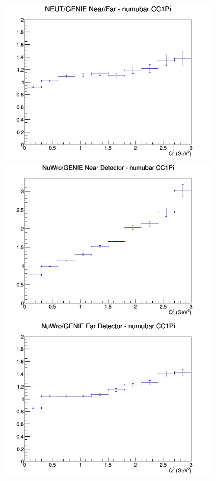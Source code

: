 \begin{figure}[h]
\endminipage
{}
\includegraphics[width=\linewidth]{eff_Q2/GAr/ratios/CC1Pi_NEUT_GENIE_numubar_NF_Q2.png}
\endminipage
\newline
{}
\includegraphics[width=\linewidth]{eff_Q2/GAr/ratios/CC1Pi_NuWro_GENIE_numubar_near_Q2.png}
\endminipage
{}
\includegraphics[width=\linewidth]{eff_Q2/GAr/ratios/CC1Pi_NuWro_GENIE_numubar_far_Q2.png}

\end{figure}
